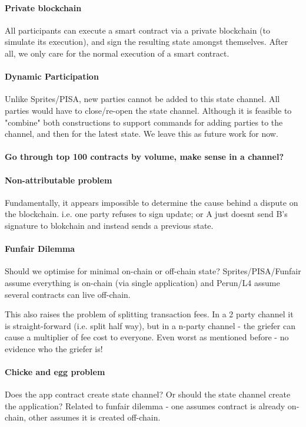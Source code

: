 \documentclass{llncs}
\begin{document}
\paragraph{Private blockchain} All participants can execute a smart contract via a private blockchain (to simulate its execution), and sign the resulting state amongst themselves. After all, we only care for the normal execution of a smart contract. 

\paragraph{Dynamic Participation} Unlike Sprites/PISA, new parties cannot be added to this state channel. All parties would have to close/re-open the state channel. Although it is feasible to "combine" both constructions to support commands for adding parties to the channel, and then for the latest state. We leave this as future work for now. 

\paragraph{Go through top 100 contracts by volume, make sense in a channel?} 
\paragraph{Non-attributable problem} Fundamentally, it appears impossible to determine the cause behind a dispute on the blockchain. i.e. one party refuses to sign update; or A just doesnt send B's signature to blokchain and instead sends a previous state.

\paragraph{Funfair Dilemma} Should we optimise for minimal on-chain or off-chain state? Sprites/PISA/Funfair assume everything is on-chain (via single application) and Perun/L4 assume several contracts can live off-chain. 

This also raises the problem of splitting transaction fees. In a 2 party channel it is straight-forward (i.e. split half way), but in a n-party channel - the griefer can cause a multiplier of fee cost to everyone. Even worst as mentioned before - no evidence who the griefer is! 

\paragraph{Chicke and egg problem} Does the app contract create state channel? Or should the state channel create the application? Related to funfair dilemma - one assumes contract is already on-chain, other assumes it is created off-chain. 
\end{document}

